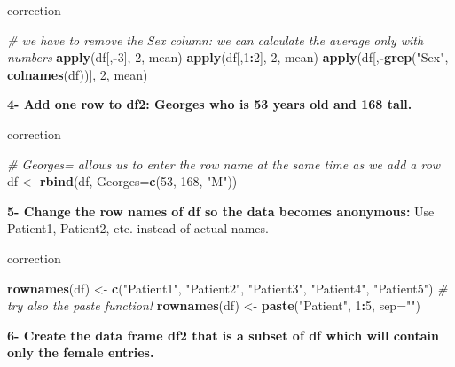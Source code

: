 \documentclass[]{book}
\newenvironment{Shaded}{\begin{snugshade}}{\end{snugshade}}
\newcommand{\CommentTok}[1]{\textcolor[rgb]{0.56,0.35,0.01}{\textit{#1}}}
\newcommand{\DataTypeTok}[1]{\textcolor[rgb]{0.13,0.29,0.53}{#1}}
\newcommand{\DecValTok}[1]{\textcolor[rgb]{0.00,0.00,0.81}{#1}}
\newcommand{\KeywordTok}[1]{\textcolor[rgb]{0.13,0.29,0.53}{\textbf{#1}}}
\newcommand{\NormalTok}[1]{#1}
\newcommand{\OperatorTok}[1]{\textcolor[rgb]{0.81,0.36,0.00}{\textbf{#1}}}
\newcommand{\StringTok}[1]{\textcolor[rgb]{0.31,0.60,0.02}{#1}}
\begin{document}
correction

\begin{Shaded}
\begin{Highlighting}[]
\CommentTok{# we have to remove the Sex column: we can calculate the average only with numbers}
\KeywordTok{apply}\NormalTok{(df[,}\OperatorTok{-}\DecValTok{3}\NormalTok{], }\DecValTok{2}\NormalTok{, mean)}
\KeywordTok{apply}\NormalTok{(df[,}\DecValTok{1}\OperatorTok{:}\DecValTok{2}\NormalTok{], }\DecValTok{2}\NormalTok{, mean)}
\KeywordTok{apply}\NormalTok{(df[,}\OperatorTok{-}\KeywordTok{grep}\NormalTok{(}\StringTok{"Sex"}\NormalTok{, }\KeywordTok{colnames}\NormalTok{(df))], }\DecValTok{2}\NormalTok{, mean)}
\end{Highlighting}
\end{Shaded}

\textbf{4- Add one row to df2: Georges who is 53 years old and 168 tall.}

correction

\begin{Shaded}
\begin{Highlighting}[]
\CommentTok{# Georges= allows us to enter the row name at the same time as we add a row}
\NormalTok{df <-}\StringTok{ }\KeywordTok{rbind}\NormalTok{(df, }\DataTypeTok{Georges=}\KeywordTok{c}\NormalTok{(}\DecValTok{53}\NormalTok{, }\DecValTok{168}\NormalTok{, }\StringTok{"M"}\NormalTok{))}
\end{Highlighting}
\end{Shaded}

\textbf{5- Change the row names of df so the data becomes anonymous:}
Use Patient1, Patient2, etc. instead of actual names.

correction

\begin{Shaded}
\begin{Highlighting}[]
\KeywordTok{rownames}\NormalTok{(df) <-}\StringTok{ }\KeywordTok{c}\NormalTok{(}\StringTok{"Patient1"}\NormalTok{, }\StringTok{"Patient2"}\NormalTok{, }\StringTok{"Patient3"}\NormalTok{, }\StringTok{"Patient4"}\NormalTok{, }\StringTok{"Patient5"}\NormalTok{)}
\CommentTok{# try also the paste function!}
\KeywordTok{rownames}\NormalTok{(df) <-}\StringTok{ }\KeywordTok{paste}\NormalTok{(}\StringTok{"Patient"}\NormalTok{, }\DecValTok{1}\OperatorTok{:}\DecValTok{5}\NormalTok{, }\DataTypeTok{sep=}\StringTok{""}\NormalTok{)}
\end{Highlighting}
\end{Shaded}

\textbf{6- Create the data frame df2 that is a subset of df which will contain only the female entries.}
\end{document}
